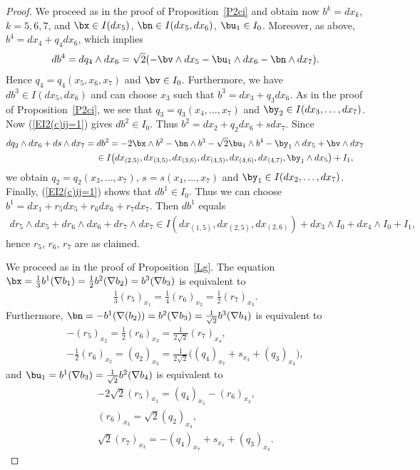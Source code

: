 \begin{proof} We proceed as in the proof of Proposition~\ref{P2ci} and obtain now $b^k=dx_k$, $k=5,6,7$, and $\bx\in I(dx_5)$, $\bn\in I(dx_5,dx_6)$, $\bu_1\in I_0$. Moreover, as above, $b^4=dx_4+q_4 dx_6$, which implies
\begin{gather*}db^4=dq_4\wedge dx_6=\sqrt2 (-\bv\wedge dx_5-\bu_1\wedge dx_6 -\bn\wedge dx_7).\end{gather*}
Hence $q_4=q_4(x_5,x_6,x_7)$ and $\bv\in I_0$. Furthermore, we have $db^3\in I(dx_5,dx_6)$ and can choose $x_3$ such that $b^3=dx_3+q_3dx_6$. As in the proof of Proposition~\ref{P2ci}, we see that $q_3=q_3(x_4,\dots,x_7)$ and $\by_2\in I(dx_3,\dots,dx_7)$. Now (\ref{EI2(c)ij=1}) gives $db^2\in I_0$. Thus $b^2=dx_2+q_2dx_6+sdx_7$. Since
\begin{gather*}
dq_2\wedge dx_6+ds\wedge dx_7 = db^2=-2\bx\wedge b^2 -\bn\wedge b^3-\sqrt2 \bu_1\wedge b^4-\by_1\wedge dx_5+\bv\wedge dx_7\\
\hphantom{dq_2\wedge dx_6+ds\wedge dx_7}{} \in I\big(dx_{(2,5)}, dx_{(3,5)}, dx_{(3,6)}, dx_{(4,5)}, dx_{(4,6)},dx_{(4,7)}, \by_1\wedge dx_5\big)+I_1,
\end{gather*}
we obtain $q_2=q_2(x_3,\dots,x_7)$, $s=s(x_4,\dots,x_7)$ and $\by_1\in I(dx_2,\dots,dx_7)$. Finally, (\ref{EI2(c)ij=1}) shows that $db^1\in I_0$. Thus we can choose $b^1=dx_1+ r_5dx_5+r_6dx_6+r_7dx_7$. Then $db^1$ equals
\begin{gather*}
dr_5\wedge dx_5+dr_6\wedge dx_6+dr_7\wedge dx_7\in I( dx_{(1,5)}, dx_{(2,5)}, dx_{(2,6)})+ dx_3\wedge I_0 +dx_4\wedge I_0+I_1,
\end{gather*}
hence $r_5$, $r_6$, $r_7$ are as claimed.

We proceed as in the proof of Proposition~\ref{Lg}. The equation $\bx=\frac13 b^1(\nabla b_1)=\frac12 b^2(\nabla b_2)=b^3(\nabla b_3)$ is equivalent to
\begin{gather}
\tfrac13(r_5)_{x_1} = \tfrac14(r_6)_{x_2} =\tfrac12 (r_7)_{x_3}.\label{ED1b}
\end{gather}
Furthermore, $\bn=-b^1(\nabla(b_2))=b^2(\nabla b_3)=\frac1{\sqrt 2} b^3(\nabla b_4)$ is equivalent to
\begin{gather}
 -(r_5)_{x_2} =\tfrac12 (r_6)_{x_3}=\tfrac1{2\sqrt 2} (r_7)_{x_4},\label{ED2b}\\
- \tfrac12 (r_6)_{x_2} =(q_2)_{x_3} =\tfrac1{2\sqrt 2}\big((q_4)_{x_7}+s_{x_4}+(q_3)_{x_4}\big), \label{E60}
\end{gather}
and $\bu_1= b^1(\nabla b_3) =\frac 1{\sqrt2}b^2(\nabla b_4 )$ is equivalent to
\begin{gather}
 -2\sqrt2 (r_5)_{x_3}=(q_4)_{x_5} -(r_6)_{x_4},\label{E61}\\
 (r_6)_{x_3}=\sqrt2 (q_2)_{x_4}, \label{E62}\\
 \sqrt2(r_7)_{x_3}= -(q_4)_{x_7} +s_{x_4}+(q_3)_{x_4} . \label{ED3b}
 \end{gather}


\end{proof}
